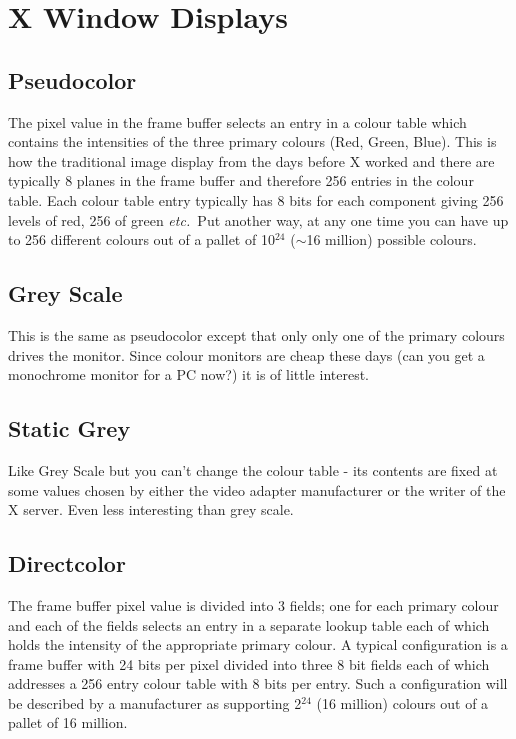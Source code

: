 \documentclass[twoside,11pt]{article}
\newcommand{\xlabel}[1]{}
\begin{document}
\section{\xlabel{sc15_display}X Window Displays\label{sc15_display}}

\subsection{\xlabel{sc15_pseudo}Pseudocolor\label{sc15_pseudo}}

The pixel value in the frame buffer selects an entry in a colour table
which contains the intensities of the three primary colours (Red, Green,
Blue). This is how the traditional image display from the days before X
worked and there are typically 8 planes in the frame buffer and therefore
256 entries in the colour table. Each colour table entry typically has 8
bits for each component giving 256 levels of red, 256 of green {\em etc.\ }Put
another way, at any one time you can have up to 256 different colours out
of a pallet of 10$^{24}$ ($\sim$16 million) possible colours.

\subsection{\xlabel{sc15_grey}Grey Scale\label{sc15_grey}}

This is the same as pseudocolor except that only only one of the primary
colours drives the monitor. Since colour monitors are cheap these days
(can you get a monochrome monitor for a PC now?) it is of little
interest.

\subsection{\xlabel{sc15_greystatic}Static Grey\label{sc15_greystatic}}

Like Grey Scale but you can't change the colour table - its contents are
fixed at some values chosen by either the video adapter manufacturer or
the writer of the X server. Even less interesting than grey scale.

\subsection{\xlabel{sc15_direct}Directcolor\label{sc15_direct}}

The frame buffer pixel value is divided into 3 fields; one for each
primary colour and each of the fields selects an entry in a separate
lookup table each of which holds the intensity of the appropriate primary
colour. A typical configuration is a frame buffer with 24 bits per pixel
divided into three 8 bit fields each of which addresses a 256 entry colour
table with 8 bits per entry. Such a configuration will be described by a
manufacturer as supporting 2$^{24}$ (16 million) colours out of a pallet of 16
million. 
\end{document}
